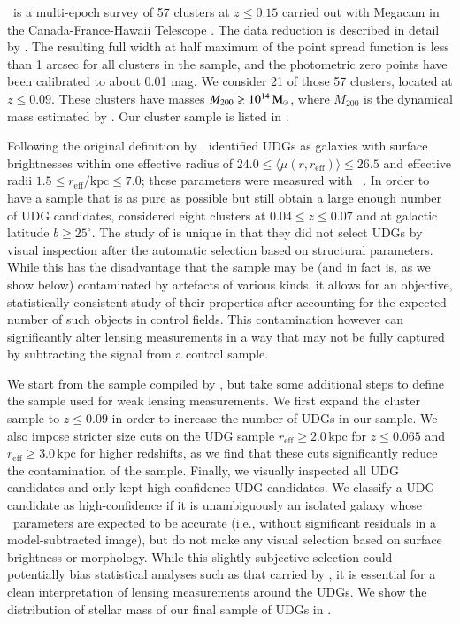\documentclass[usenatbib,fleqn]{mnras}
\def\reff{r_\mathrm{eff}}
\begin{document}
\meneacs\ is a multi-epoch survey of 57 clusters at $z\leq0.15$ carried out with Megacam in the Canada-France-Hawaii Telescope \citep{sand12}. The data reduction is described in detail by \cite{vdburg13}. The resulting full width at half maximum of the point spread function is less than 1 arcsec for all clusters in the sample, and the photometric zero points have been calibrated to about 0.01 mag.
%
We consider 21 of those 57 clusters, located at $z\leq0.09$. These clusters have masses $M_{200}\gtrsim10^{14}\,\mathrm{M}_\odot$, where $M_{200}$ is the dynamical mass estimated by \cite{sifon15_cccp}. Our cluster sample is listed in .

Following the original definition by \cite{vandokkum15_coma}, \cite{vdburg16} identified UDGs as galaxies with surface brightnesses within one effective radius of $24.0\leq \langle\mu(r,\reff)\rangle\leq26.5$ and effective radii $1.5\leq\reff/\mathrm{kpc}\leq7.0$; these parameters were measured with \galfit\ \citep{peng02,peng10}. In order to have a sample that is as pure as possible but still obtain a large enough number of UDG candidates, \cite{vdburg16} considered eight clusters at $0.04\leq z \leq0.07$ and at galactic latitude $b\geq25^\circ$. The study of \cite{vdburg16} is unique in that they did not select UDGs by visual inspection after the automatic selection based on structural parameters. While this has the disadvantage that the sample may be (and in fact is, as we show below) contaminated by artefacts of various kinds, it allows for an objective, statistically-consistent study of their properties after accounting for the expected number of such objects in control fields. This contamination however can significantly alter lensing measurements in a way that may not be fully captured by subtracting the signal from a control sample.

We start from the sample compiled by \cite{vdburg16}, but take some additional steps to define the sample used for weak lensing measurements. We first expand the cluster sample to $z\leq0.09$ in order to increase the number of UDGs in our sample. We also impose stricter size cuts on the UDG sample $\reff\geq2.0\,\mathrm{kpc}$ for $z\leq0.065$ and $\reff\geq3.0\,\mathrm{kpc}$ for higher redshifts, as we find that these cuts significantly reduce the contamination of the sample. Finally, we visually inspected all UDG candidates and only kept high-confidence UDG candidates. We classify a UDG candidate as high-confidence if it is unambiguously an isolated galaxy whose \galfit\ parameters are expected to be accurate (i.e., without significant residuals in a model-subtracted image), but do not make any visual selection based on surface brightness or morphology. While this slightly subjective selection could potentially bias statistical analyses such as that carried by \cite{vdburg16}, it is essential for a clean interpretation of lensing measurements around the UDGs. We show the distribution of stellar mass of our final sample of UDGs in .
\end{document}
